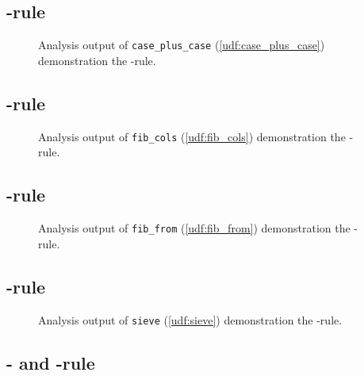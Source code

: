 \FloatBarrier
\subsection{\REXPR-rule}

\begin{figure}[h!]
    \centering
    
    \caption{Analysis output of \texttt{case\_plus\_case} (\autoref{udf:case_plus_case}) demonstration the \REXPR-rule.}
    \label{scenarios:case_plus_case}
\end{figure}

\FloatBarrier

\subsection{\RSELECT-rule}

\begin{figure}[h!]
    \centering
    
    \caption{Analysis output of \texttt{fib\_cols} (\autoref{udf:fib_cols}) demonstration the \RSELECT-rule.}
    \label{scenarios:fib_cols}
\end{figure}
\FloatBarrier

\subsection{\RFROM-rule}

\begin{figure}[h!]
    \centering
    
    \caption{Analysis output of \texttt{fib\_from} (\autoref{udf:fib_from}) demonstration the \RFROM-rule.}
    \label{scenarios:fib_from}
\end{figure}

\FloatBarrier
\subsection{\RWHERE-rule}

\begin{figure}[h!]
    \centering
    
    \caption{Analysis output of \texttt{sieve} (\autoref{udf:sieve}) demonstration the \RFROM-rule.}
    \label{scenarios:sieve}
\end{figure}
\FloatBarrier

\subsection{\RCTE- and \RWITH-rule}

